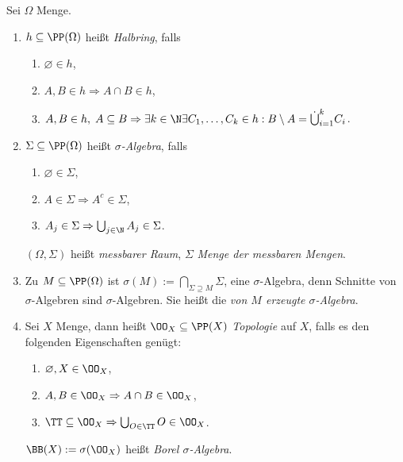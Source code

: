 \begin{defn}
\label{defn:3.4}
Sei $\Omega$ Menge.
\begin{enumerate}[label=\arabic{*}.)]
  \item $h\subseteq \PP(\Omega)$ heißt \emph{Halbring}, falls
  \begin{enumerate}[label=(\roman{*})]
    \item $\varnothing\in h$,
    \item $A,B\in h \Rightarrow A\cap B\in h$,
    \item $A,B\in h,\;A\subseteq B \Rightarrow \exists k\in \N \exists
    C_1,\ldots,C_k\in h : B\setminus A = \dot{\bigcup}_{i=1}^k C_i$.
  \end{enumerate}
  \item $\Sigma\subseteq\PP(\Omega)$ heißt \emph{$\sigma$-Algebra}, falls
  \begin{enumerate}[label=(\roman{*})]
    \item $\varnothing\in \Sigma$,
    \item $A\in\Sigma\Rightarrow A^c\in\Sigma$,
    \item $A_j\in\Sigma \Rightarrow \bigcup_{j\in\N} A_j \in \Sigma$.
  \end{enumerate}
  $(\Omega,\Sigma)$ heißt \emph{messbarer Raum}, $\Sigma$ \emph{Menge der
messbaren Mengen}.
\item Zu $M\subseteq\PP(\Omega)$ ist $\sigma(M) := \bigcap_{\Sigma\supseteq M}
\Sigma$, eine $\sigma$-Algebra, denn Schnitte von $\sigma$-Algebren sind
$\sigma$-Algebren. Sie heißt die \emph{von $M$ erzeugte $\sigma$-Algebra}.
\item Sei $X$ Menge, dann heißt $\OO_X\subseteq\PP(X)$ \emph{Topologie} auf
$X$, falls es den folgenden Eigenschaften genügt:
\begin{enumerate}[label=(\roman{*})]
  \item $\varnothing,X\in\OO_X$,
  \item $A,B\in\OO_X\Rightarrow A\cap B\in\OO_X$,
  \item $\TT\subseteq \OO_X \Rightarrow \bigcup_{O\in\TT} O \in \OO_X$.
\end{enumerate}
$\BB(X) := \sigma(\OO_X)$ heißt \emph{Borel $\sigma$-Algebra}.\fishhere
\end{enumerate}
\end{defn}


